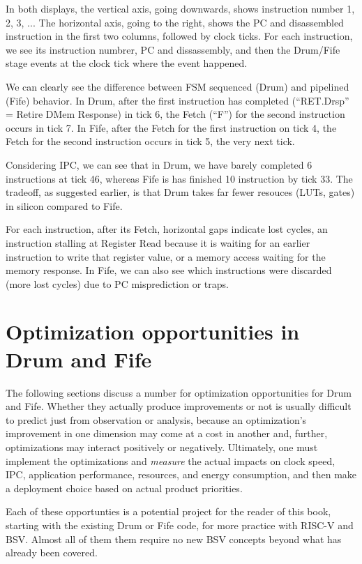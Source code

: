 In both displays, the vertical axis, going downwards, shows
instruction number 1, 2, 3, ...  The horizontal axis, going to the
right, shows the PC and disassembled instruction in the first two
columns, followed by clock ticks.  For each instruction, we see its
instruction numbrer, PC and dissassembly, and then the Drum/Fife stage
events at the clock tick where the event happened.

We can clearly see the difference between FSM sequenced (Drum) and
pipelined (Fife) behavior.  In Drum, after the first instruction has
completed (``RET.Drsp'' = Retire DMem Response) in tick 6, the Fetch
(``F'') for the second instruction occurs in tick 7.  In Fife, after
the Fetch for the first instruction on tick 4, the Fetch for the
second instruction occurs in tick 5, the very next tick.

Considering IPC, we can see that in Drum, we have barely completed 6
instructions at tick 46, whereas Fife is has finished 10 instruction
by tick 33.  The tradeoff, as suggested earlier, is that Drum takes
far fewer resouces (LUTs, gates) in silicon compared to Fife.

For each instruction, after its Fetch, horizontal gaps indicate lost
cycles, {\eg} an instruction stalling at Register Read because it is
waiting for an earlier instruction to write that register value, or a
memory access waiting for the memory response.  In Fife, we can also
see which instructions were discarded (more lost cycles) due to PC
misprediction or traps.


\section{Optimization opportunities in Drum and Fife}

The following sections discuss a number for optimization opportunities
for Drum and Fife.  Whether they actually produce improvements or not
is usually difficult to predict just from observation or analysis,
because an optimization's improvement in one dimension may come at a
cost in another and, further, optimizations may interact positively or
negatively.  Ultimately, one must implement the optimizations and
\emph{measure} the actual impacts on clock speed, IPC, application
performance, resources, and energy consumption, {\etc} and then make a
deployment choice based on actual product priorities.

Each of these opportunties is a potential project for the reader of
this book, starting with the existing Drum or Fife code, for more
practice with RISC-V and BSV.  Almost all of them them require no new
BSV concepts beyond what has already been covered.

